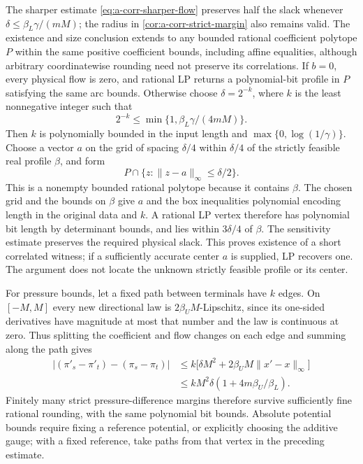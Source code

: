 The sharper estimate \cref{eq:a-corr-sharper-flow} preserves half
the slack whenever $\delta\le\beta_L\gamma/(mM)$; the radius in
\cref{cor:a-corr-strict-margin} also remains valid. The existence and
size conclusion extends to any bounded rational coefficient polytope $P$
within the same positive coefficient bounds, including affine
equalities, although arbitrary coordinatewise rounding need not
preserve its correlations. If $b=0$,
every physical flow is zero, and rational LP returns a polynomial-bit
profile in $P$ satisfying the same arc bounds. Otherwise choose
$\delta=2^{-k}$, where $k$ is the least nonnegative integer such that
\[
 2^{-k}\le\min\{1,\beta_L\gamma/(4mM)\}.
\]
Then $k$ is polynomially bounded in the input length and
$\max\{0,\log(1/\gamma)\}$. Choose a vector $a$ on the grid of spacing
$\delta/4$ within $\delta/4$ of the strictly feasible real profile
$\beta$, and form
\[
 P\cap\{z:\|z-a\|_\infty\le\delta/2\}.
\]
This is a nonempty bounded rational polytope because it contains
$\beta$. The chosen grid and the bounds on $\beta$ give $a$ and the box
inequalities polynomial encoding length in the original data and $k$.
A rational LP vertex therefore has polynomial bit length by determinant
bounds, and lies within
$3\delta/4$ of $\beta$. The sensitivity estimate preserves the required
physical slack. This proves existence of a short correlated witness;
if a sufficiently accurate center $a$ is supplied, LP recovers one.
The argument does not locate the unknown strictly feasible profile or
its center.

For pressure bounds, let a fixed path between terminals have $k$ edges.
On $[-M,M]$
every new directional law is $2\beta_U M$-Lipschitz, since its one-sided
derivatives have magnitude at most that number and the law is continuous
at zero. Thus splitting the coefficient and flow changes on each edge
and summing along the path gives
\begin{equation}
 \begin{split}
 |(\pi'_s-\pi'_t)-(\pi_s-\pi_t)|
 &\le k\bigl[\delta M^2+2\beta_U M\|x'-x\|_\infty\bigr]\\
 &\le kM^2\delta(1+4m\beta_U/\beta_L).
 \end{split}
 \label{eq:a-corr-pressure-rounding}
\end{equation}
Finitely many strict pressure-difference margins therefore survive
sufficiently fine rational rounding, with the same polynomial bit bounds.
Absolute potential bounds require fixing a reference potential, or
explicitly choosing the additive gauge; with a fixed reference, take
paths from that vertex in the preceding estimate.

